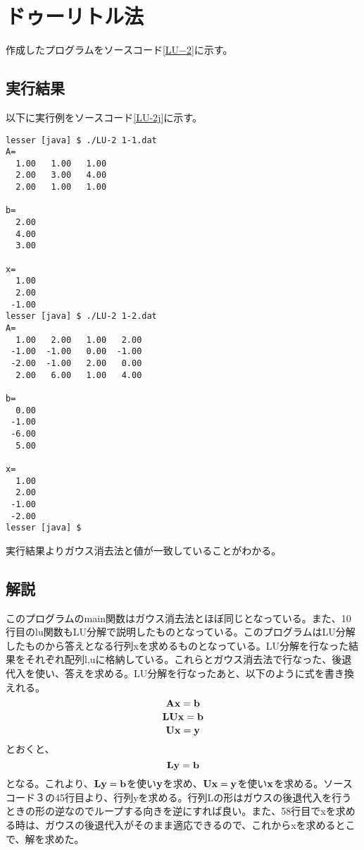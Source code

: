 \documentclass{jsarticle}
\begin{document}
\section{ドゥーリトル法}
作成したプログラムをソースコード\ref{LU−2}に示す。

\subsection{実行結果}
以下に実行例をソースコード\ref{LU-2j}に示す。
\begin{lstlisting}[caption=ドゥーリトル法の実行結果,label=LU-2j]
lesser [java] $ ./LU-2 1-1.dat
A=
  1.00   1.00   1.00 
  2.00   3.00   4.00 
  2.00   1.00   1.00 

b=
  2.00 
  4.00 
  3.00 

x=
  1.00 
  2.00 
 -1.00 
lesser [java] $ ./LU-2 1-2.dat
A=
  1.00   2.00   1.00   2.00 
 -1.00  -1.00   0.00  -1.00 
 -2.00  -1.00   2.00   0.00 
  2.00   6.00   1.00   4.00 

b=
  0.00 
 -1.00 
 -6.00 
  5.00 

x=
  1.00 
  2.00 
 -1.00 
 -2.00 
lesser [java] $ 
\end{lstlisting}
実行結果よりガウス消去法と値が一致していることがわかる。
\subsection{解説}
このプログラムのmain関数はガウス消去法とほぼ同じとなっている。また、10行目のlu関数もLU分解で説明したものとなっている。このプログラムはLU分解したものから答えとなる行列xを求めるものとなっている。LU分解を行なった結果をそれぞれ配列l,uに格納している。これらとガウス消去法で行なった、後退代入を使い、答えを求める。LU分解を行なったあと、以下のように式を書き換えれる。
\[
\bf{Ax}=\bf{b}
\]
\[
\bf{LUx}=\bf{b}
\]
\[
\bf{Ux}=\bf{y}
\]
とおくと、
\[
\bf{Ly}=\bf{b}
\]
となる。これより、$\bf{Ly}=\bf{b}$を使い$\bf{y}$を求め、$\bf{Ux}=\bf{y}$を使い$\bf{x}$を求める。ソースコード３の45行目より、行列yを求める。行列Lの形はガウスの後退代入を行うときの形の逆なのでループする向きを逆にすれば良い。また、58行目でxを求める時は、ガウスの後退代入がそのまま適応できるので、これからxを求めるとこで、解を求めた。
\end{document}
